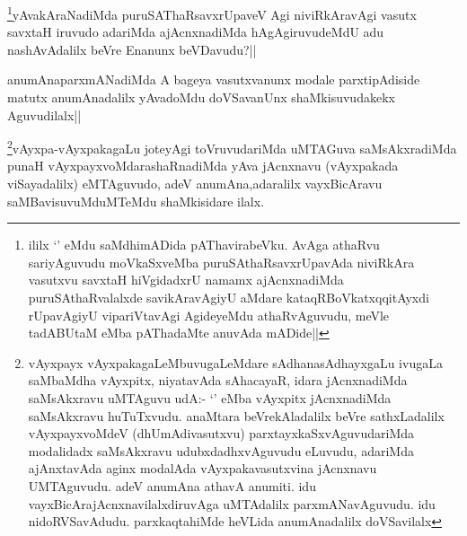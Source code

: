 \begin{artha}
\footnote{ililx `\stext' eMdu saMdhimADida pAThavirabeVku. AvAga athaRvu sariyAguvudu moVkaSxveMba puruSAthaRsavxrUpavAda niviRkAra vasutxvu savxtaH hiVgidadxrU namamx ajAcnxnadiMda puruSAthaRvalalxde savikAravAgiyU aMdare kataqRBoVkatxqqitAyxdi rUpavAgiyU vipariVtavAgi AgideyeMdu athaRvAguvudu, meVle tadABUtaM eMba pAThadaMte anuvAda mADide||}yAvakAraNadiMda puruSAThaRsavxrUpaveV Agi niviRkAravAgi vasutx savxtaH iruvudo adariMda ajAcnxnadiMda hAgAgiruvudeMdU adu nashAvAdalilx beVre Enanunx beVDavudu?||
\end{artha}

\begin{artha}
anumAnaparxmANadiMda A bageya vasutxvanunx modale parxtipAdiside matutx anumAnadalilx yAvadoMdu doVSavanUnx shaMkisuvudakekx Aguvudilalx||
\end{artha}

\begin{artha}
\footnote{vAyxpayx vAyxpakagaLeMbuvugaLeMdare sAdhanasAdhayxgaLu ivugaLa saMbaMdha vAyxpitx, niyatavAda sAhacayaR, idara jAcnxnadiMda saMsAkxravu uMTAguvu udA:- `\stext' eMba vAyxpitx jAcnxnadiMda saMsAkxravu huTuTxvudu. anaMtara beVrekAladalilx  beVre sathxLadalilx vAyxpayxvoMdeV (dhUmAdivasutxvu) parxtayxkaSxvAguvudariMda modalidadx saMsAkxravu udubxdadhxvAguvudu eLuvudu, adariMda ajAnxtavAda aginx modalAda vAyxpakavasutxvina jAcnxnavu UMTAguvudu. adeV anumAna athavA anumiti. idu vayxBicArajAcnxnavilalxdiruvAga uMTAdalilx parxmANavAguvudu. idu nidoRVSavAdudu. parxkaqtahiMde heVLida anumAnadalilx doVSavilalx}vAyxpa-vAyxpakagaLu joteyAgi toVruvudariMda uMTAGuva saMsAkxradiMda punaH vAyxpayxvoMdarashaRnadiMda yAva jAcnxnavu (vAyxpakada viSayadalilx) eMTAguvudo, adeV anumAna,adaralilx vayxBicAravu saMBavisuvuMduMTeMdu shaMkisidare ilalx.
\end{artha}


